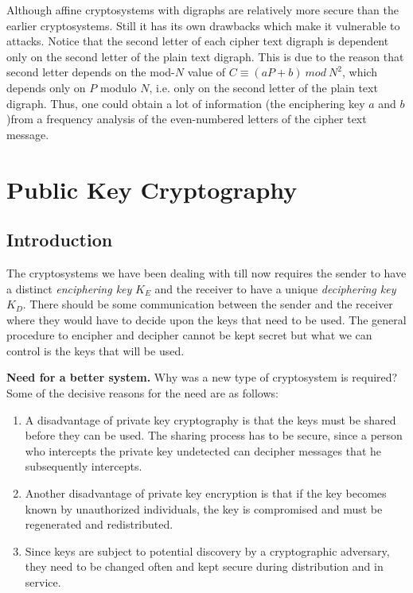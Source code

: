 \documentclass[12pt]{article}
\begin{document}
Although affine cryptosystems with digraphs are relatively more secure than the earlier cryptosystems. Still it has its own drawbacks which make it vulnerable to attacks. Notice that the second letter of each cipher text digraph is dependent only on the second letter of the plain text digraph. This is due to the reason   that second letter depends on the mod-$N$ value of  $C \equiv (aP+b) \: mod \: N^2$, which depends only on $P$ modulo $N$, i.e. only on the second letter of the plain text digraph. Thus, one could obtain a lot of information (the enciphering key $a$ and $b$)from a frequency analysis of the even-numbered letters of the cipher text message.


\section{Public Key Cryptography}

\subsection{Introduction}
The cryptosystems we have been  dealing with till now requires the sender to have a distinct \textit{enciphering key} $K_E$ and the receiver to have a unique \textit{deciphering key} $K_D$. There should be some communication between the sender and the receiver where they would have to decide upon the keys that need to be used.  The general procedure to encipher and decipher cannot be kept secret  but what we can control is the keys that will be used.

\textbf{Need for a better system.} Why was a new type of cryptosystem is required? Some of the decisive reasons for the need are as follows:
\begin{enumerate}
\item A disadvantage of private key cryptography is that the keys must be shared before they can be used. The sharing process has to be secure, since a person who intercepts the private key undetected can decipher messages that he subsequently intercepts.
\item Another disadvantage of private key encryption is that if the key becomes known by unauthorized individuals, the key is compromised and must be regenerated and redistributed.
\item Since keys are subject to potential discovery by a cryptographic adversary, they need to be changed often and kept secure during distribution and in service.
\end{enumerate}
\end{document}
